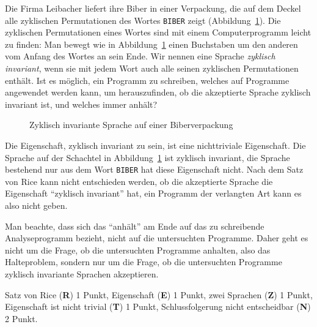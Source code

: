 Die Firma Leibacher liefert ihre Biber in einer Verpackung, die auf dem
Deckel alle zyklischen Permutationen des Wortes \texttt{BIBER} zeigt
(Abbildung~\ref{60000041:fig}).
Die zyklischen Permutationen eines Wortes sind mit einem Computerprogramm
leicht zu finden: Man bewegt wie in Abbildung~\ref{60000041:fig} 
einen Buchstaben um den anderen vom Anfang des Wortes an sein Ende.
Wir nennen eine Sprache {\em zyklisch invariant}, wenn sie mit jedem
Wort auch alle seinen zyklischen Permutationen enthält.
Ist es möglich, ein Programm zu schreiben, welches auf Programme
angewendet werden kann, um herauszufinden,
ob die akzeptierte Sprache zyklisch invariant ist, und welches immer
anhält?
\begin{figure}[h]
\centering
{}
\caption{Zyklisch invariante Sprache auf einer Biberverpackung
\label{60000041:fig}}
\end{figure}

\begin{loesung}
Die Eigenschaft, zyklisch invariant zu sein, ist eine nichttriviale
Eigenschaft.
Die Sprache auf der Schachtel in Abbildung~\ref{60000041:fig} ist
zyklisch invariant, die Sprache bestehend nur aus dem Wort
\texttt{BIBER} hat diese Eigenschaft nicht.
Nach dem Satz von Rice kann nicht entschieden werden, ob die akzeptierte
Sprache die Eigenschaft ``zyklisch invariant'' hat, ein Programm der 
verlangten Art kann es also nicht geben.
\end{loesung}

\begin{diskussion}
Man beachte, dass sich das ``anhält'' am Ende auf das zu schreibende
Analyseprogramm bezieht, nicht auf die untersuchten Programme.
Daher geht es nicht um die Frage, ob die untersuchten Programme
anhalten, also das Halteproblem, sondern nur um die Frage, ob die
untersuchten Programme zyklisch invariante Sprachen akzeptieren.
\end{diskussion}

\begin{bewertung}
Satz von Rice ({\bf R}) 1 Punkt,
Eigenschaft ({\bf E}) 1 Punkt,
zwei Sprachen ({\bf Z}) 1 Punkt,
Eigenschaft ist nicht trivial ({\bf T}) 1 Punkt,
Schlussfolgerung nicht entscheidbar ({\bf N}) 2 Punkt.
\end{bewertung}



